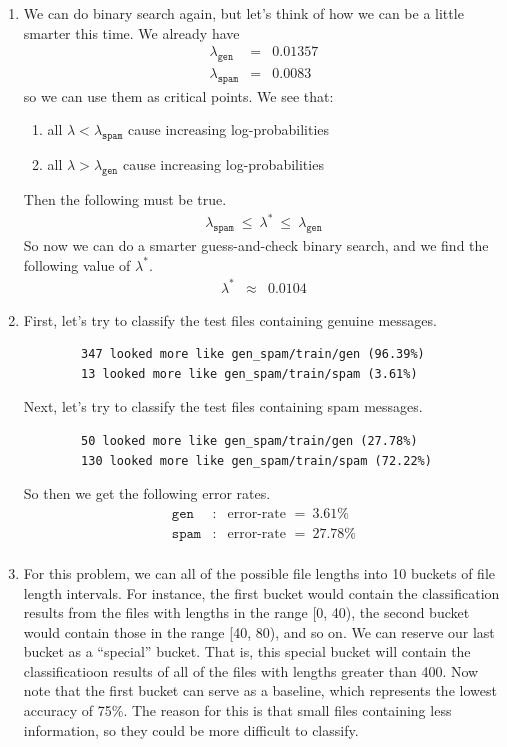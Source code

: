 \documentclass[11pt]{article}
\begin{document}
\begin{enumerate}
\begin{enumerate}[label=(\alph*)]
	\item %
		We can do binary search again, but let's think of how we can be a little smarter this time. We already have 
		\begin{eqnarray*}
			\lambda_{\texttt{gen}} &=& 0.01357 \\
			\lambda_{\texttt{spam}} &=& 0.0083
		\end{eqnarray*}
		so we can use them as critical points. We see that:
		\begin{enumerate}[label=(\roman*)]
		\item all $\lambda < \lambda_{\texttt{spam}}$ cause increasing log-probabilities
		\item all $\lambda > \lambda_{\texttt{gen}}$ cause increasing log-probabilities
		\end{enumerate}
		Then the following must be true. 
		\begin{eqnarray*}
			\lambda_{\texttt{spam}} \ \le \ \lambda^* \ \le \ \lambda_{\texttt{gen}}
		\end{eqnarray*}
		So now we can do a smarter guess-and-check binary search, and we find the following value of $\lambda^*$.
		\begin{eqnarray*}
			\lambda^* &\approx& 0.0104
		\end{eqnarray*}
	\item %
		First, let's try to classify the test files containing genuine messages.
		\begin{lstlisting}
		347 looked more like gen_spam/train/gen (96.39%)
		13 looked more like gen_spam/train/spam (3.61%)
		\end{lstlisting}
		Next, let's try to classify the test files containing spam messages.
		\begin{lstlisting}
		50 looked more like gen_spam/train/gen (27.78%)
		130 looked more like gen_spam/train/spam (72.22%)
		\end{lstlisting}
		So then we get the following error rates.
		\begin{eqnarray*}
			\texttt{gen} &\colon& \text{error-rate } = \ 3.61\% \\
			\texttt{spam} &\colon& \text{error-rate } = \ 27.78\% \\
		\end{eqnarray*}
	\item %
		For this problem, we can all of the possible file lengths into 10 buckets of file length intervals. For instance, the first bucket would contain the classification results from the files with lengths in the range [0, 40), the second bucket would contain those in the range [40, 80), and so on. We can reserve our last bucket as a ``special'' bucket. That is, this special bucket will contain the classificatioon results of all of the files with lengths greater than 400. Now note that the first bucket can serve as a baseline, which represents the lowest accuracy of 75\%. The reason for this is that small files containing less information, so they could be more difficult to classify. \vspace{4pt}


\end{enumerate}
\end{enumerate}
\end{document}
